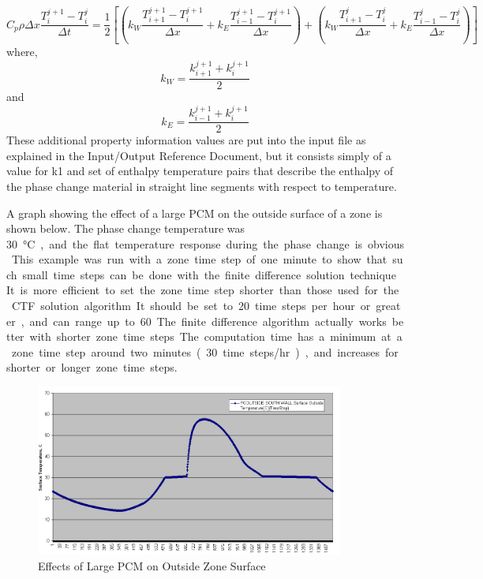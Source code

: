 \begin{equation}
C_p\rho\Delta x\frac{T_i^{j + 1} - T_i^j}{\Delta t} = 
\frac{1}{2}\left[ \left( k_W\frac{T_{i + 1}^{j + 1} - T_i^{j + 1}}{\Delta x}
                       + k_E\frac{T_{i - 1}^{j + 1} - T_i^{j + 1}}{\Delta x}
                 \right)
                + \left( k_W\frac{T_{i + 1}^j - T_i^j}{\Delta x}
                       + k_E\frac{T_{i - 1}^j - T_i^j}{\Delta x}\right)\right]
\end{equation}
%
where,
%
\begin{equation}
k_W = \frac{k_{i + 1}^{j + 1} + k_i^{j + 1}}{2}
\end{equation}
%
and
%
\begin{equation}
k_E = \frac{k_{i - 1}^{j + 1} + k_i^{j + 1}}{2}
\end{equation}
%
These additional property information values are put into the input file as
explained in the Input/Output Reference Document, but it consists simply of a
value for k1 and set of enthalpy temperature pairs that describe the enthalpy of
the phase change material in straight line segments with respect to temperature.

A graph showing the effect of a large PCM on the outside surface of a zone is
shown below. The phase change temperature was \SI{30}\celsius, and the flat
temperature response during the phase change is obvious. This example was run
with a zone time step of one minute to show that such small time steps can be
done with the finite difference solution technique. It is more efficient to set
the zone time step shorter than those used for the CTF solution algorithm. It
should be set to 20 time steps per hour or greater, and can range up to 60. The
finite difference algorithm actually works better with shorter zone time steps.
The computation time has a minimum at a zone time step around two minutes (30
time steps/hr), and increases for shorter or longer zone time steps.

\begin{figure}[hbtp] %
\centering
\includegraphics[width=0.9\textwidth, height=0.9\textheight,
keepaspectratio=true]{media/image185.png}
\caption{Effects of Large PCM on Outside Zone Surface \protect
\label{fig:effects-of-large-pcm-on-outside-zone-surface}}
\end{figure}

